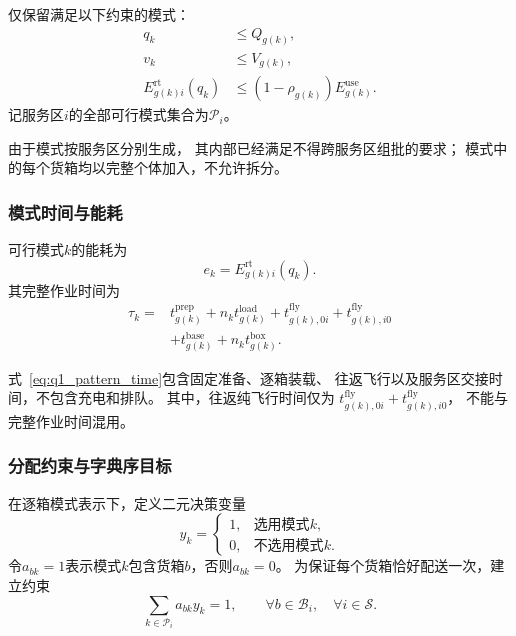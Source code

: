 \documentclass[bwprint]{gmcmthesis}
\begin{document}
仅保留满足以下约束的模式：
\begin{align}
    q_k &\leq Q_{g(k)},\\
    v_k &\leq V_{g(k)},\\
    E_{g(k)i}^{\mathrm{rt}}(q_k)
    &\leq
    (1-\rho_{g(k)})E_{g(k)}^{\mathrm{use}}.
\end{align}
记服务区$i$的全部可行模式集合为$\mathcal{P}_i$。

由于模式按服务区分别生成，
其内部已经满足不得跨服务区组批的要求；
模式中的每个货箱均以完整个体加入，不允许拆分。

\subsubsection{模式时间与能耗}

可行模式$k$的能耗为
\begin{equation}
    e_k=E_{g(k)i}^{\mathrm{rt}}(q_k).
\end{equation}
其完整作业时间为
\begin{equation}
\begin{aligned}
    \tau_k={}&
    t_{g(k)}^{\mathrm{prep}}
    +n_k t_{g(k)}^{\mathrm{load}}
    +t_{g(k),0i}^{\mathrm{fly}}
    +t_{g(k),i0}^{\mathrm{fly}}\\
    &+
    t_{g(k)}^{\mathrm{base}}
    +n_k t_{g(k)}^{\mathrm{box}}.
\end{aligned}
\label{eq:q1_pattern_time}
\end{equation}

式~\eqref{eq:q1_pattern_time}包含固定准备、逐箱装载、
往返飞行以及服务区交接时间，不包含充电和排队。
其中，往返纯飞行时间仅为
$t_{g(k),0i}^{\mathrm{fly}}+t_{g(k),i0}^{\mathrm{fly}}$，
不能与完整作业时间混用。

\subsubsection{分配约束与字典序目标}

在逐箱模式表示下，定义二元决策变量
\begin{equation}
    y_k=
    \begin{cases}
        1,&\text{选用模式}k,\\
        0,&\text{不选用模式}k.
    \end{cases}
\end{equation}
令$a_{bk}=1$表示模式$k$包含货箱$b$，否则$a_{bk}=0$。
为保证每个货箱恰好配送一次，建立约束
\begin{equation}
    \sum_{k\in\mathcal{P}_i}a_{bk}y_k=1,
    \qquad
    \forall b\in\mathcal{B}_i,\quad
    \forall i\in\mathcal{S}.
\label{eq:q1_exact_assignment}
\end{equation}
\end{document}
